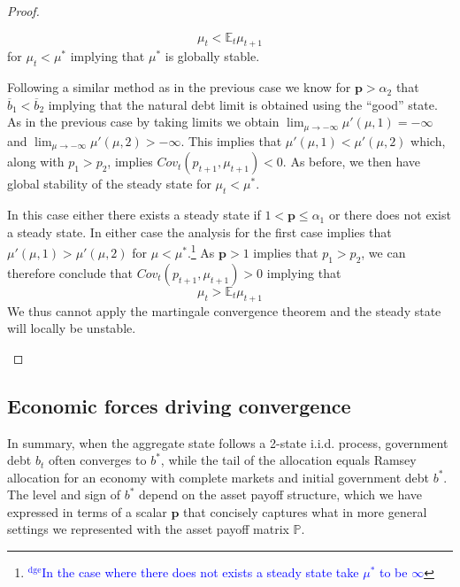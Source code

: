 \documentclass[12pt]{article}
\newcommand{\dge}[1]{\textcolor{blue}{$^{\textrm{dge}}${#1}}}
\newcommand{\EE}{\mathbb E}
\begin{document}
\begin{proof}
{\begin{description}
	\[
		\mu_t < \EE_t\mu_{t+1}
	\] for $\mu_t < \mu^*$ implying that $\mu^*$ is globally stable.
	\item[2. $\bm p \geq \alpha_2$:]  Following a similar method as in the previous case we know for $\bm p > \alpha_2$ that $\overline b_1 < \overline b_2$ implying that the natural debt limit is obtained using the ``good'' state.  As in the previous case by taking limits we obtain $\lim_{\mu\rightarrow-\infty} \mu'(\mu,1) = -\infty$ and $\lim_{\mu\rightarrow-\infty}\mu'(\mu,2) > -\infty$.  This implies that $\mu'(\mu,1) < \mu'(\mu,2)$ which, along with $p_1 > p_2$, implies $Cov_t(p_{t+1},\mu_{t+1}) <0$.  As before, we then have global stability of the steady state for $\mu_t < \mu^*$.
	\item[3. $\min(\alpha_1,1) < \bm p < \alpha_2$:]   In this case either there exists a steady state if $1 < \bm p \leq \alpha_1$ or there does not exist a steady state.  In either case the analysis for the first case implies that $\mu'(\mu,1) > \mu'(\mu,2)$ for $\mu < \mu ^*$.\footnote{\dge{In the case where there does not exists a steady state take $\mu^*$ to be $\infty$}}  As $\bm p >1$ implies that $p_1 > p_2$, we can therefore conclude that $Cov_t(p_{t+1},\mu_{t+1}) > 0$ implying that 
	\[
		\mu_t > \EE_t \mu_{t+1}
	\]We thus cannot apply the martingale convergence theorem and the steady state will locally be unstable.
\end{description} }
\end{proof}




\subsection{Economic forces driving convergence}
In summary, when the aggregate state follows a 2-state i.i.d. process, government debt  $b_t$ often converges to $b^*$, while
the tail of the allocation equals  Ramsey allocation for an economy with complete markets and initial government  debt $b^*$.
  The level  and sign of $b^*$ depend on the asset payoff structure, which we have  expressed in terms of a  scalar
  $\bm{p}$ that concisely captures what in more general settings we represented with the asset payoff matrix $\mathbb{P}$.
\end{document}
